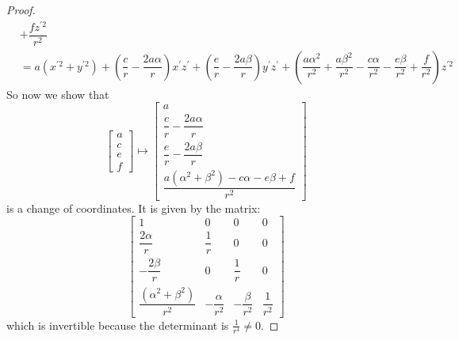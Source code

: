 \documentclass{article}
\begin{document}
\begin{proof}
\begin{align*}
                  &  + \dfrac{fz^{\prime2}}{r^{2}}                                                                                                                                                                                                                                                           \\
                  &= a(x^{\prime2} + y^{\prime2}) + (\dfrac{c}{r} - \dfrac{2a\alpha}{r})x^{\prime}z^{\prime} + (\dfrac{e}{r} - \dfrac{2a\beta}{r})y^{\prime}z^{\prime} + (\dfrac{a\alpha^{2}}{r^{2}} + \dfrac{a\beta^{2}}{r^{2}} - \dfrac{c\alpha}{r^{2}} - \dfrac{e\beta}{r^{2}} + \dfrac{f}{r^{2}})z^{\prime2}   
            \end{align*}
        So now we show that
            \begin{equation*}
                \begin{bmatrix}
                    a \\
                    c \\
                    e \\
                    f   
                \end{bmatrix} \mapsto \begin{bmatrix}
                    a                                                               \\
                    \dfrac{c}{r} - \dfrac{2a\alpha}{r}                              \\
                    \dfrac{e}{r} - \dfrac{2a\beta}{r}                               \\
                    \dfrac{a(\alpha^{2} + \beta^{2}) - c\alpha - e\beta + f}{r^{2}}   
                \end{bmatrix}
            \end{equation*}
        is a change of coordinates. It is given by the matrix:
            \begin{equation*}
                \begin{bmatrix}
                    1                                       & 0                      & 0                     & 0                \\
                    \dfrac{2\alpha}{r}                      & \dfrac{1}{r}           & 0                     & 0                \\
                    -\dfrac{2\beta}{r}                      & 0                      & \dfrac{1}{r}          & 0                \\
                    \dfrac{(\alpha^{2} + \beta^{2})}{r^{2}} & -\dfrac{\alpha}{r^{2}} & -\dfrac{\beta}{r^{2}} & \dfrac{1}{r^{2}}   
                \end{bmatrix}
            \end{equation*}
        which is invertible because the determinant is $\frac{1}{r^{4}} \neq 0$.
    \end{proof}
\end{document}
